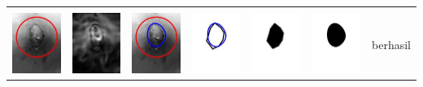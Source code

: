 \begin{table}[H]
\begin{tabular}{|m{0.7in}|m{0.7in}|m{0.7in}|m{0.7in}|m{0.7in}|m{0.7in}|m{0.7in}|}
		&  &  & & & &  \\
		\includegraphics[width=0.7in]{dataset/dataset_3/luka_kuning/ready/19_interp_init.jpg}&
		\includegraphics[width=0.7in]{dataset/dataset_3/luka_kuning/ready/19_interp_ext.jpg}&
		\includegraphics[width=0.7in]{dataset/dataset_3/luka_kuning/ready/19_interp_result.jpg}&
		\includegraphics[width=0.7in]{dataset/dataset_3/luka_kuning/ready/19_gt_r.jpg}&
		\includegraphics[width=0.7in]{dataset/dataset_3/luka_kuning/ready/19_r.jpg}&
		\includegraphics[width=0.7in]{dataset/dataset_3/luka_kuning/ready/19_interp_r.jpg}&
		berhasil\\
		\hline
		

\end{tabular}
\end{table}
